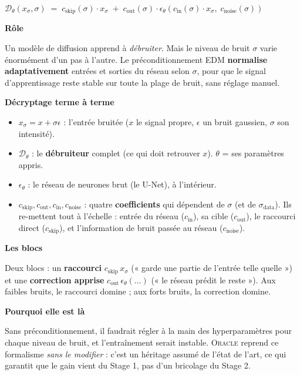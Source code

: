 \documentclass[11pt,a4paper]{article}
\newcommand{\Oracle}{\textsc{Oracle}}
\newcommand{\bloc}[1]{\par\medskip\noindent\textcolor{accent}{\textbf{#1}}\par\nopagebreak\smallskip}
\begin{document}
\begin{formulebox}
\centering $\mathcal{D}_\theta(x_\sigma, \sigma) \;=\; c_{\mathrm{skip}}(\sigma) \cdot x_\sigma \;+\; c_{\mathrm{out}}(\sigma) \cdot \epsilon_\theta\!\left( c_{\mathrm{in}}(\sigma) \cdot x_\sigma,\; c_{\mathrm{noise}}(\sigma) \right)$
\end{formulebox}

\bloc{Rôle}
Un modèle de diffusion apprend à \emph{débruiter}. Mais le niveau de bruit $\sigma$ varie énormément d'un pas à l'autre. Le préconditionnement EDM \textbf{normalise adaptativement} entrées et sorties du réseau selon $\sigma$, pour que le signal d'apprentissage reste stable sur toute la plage de bruit, sans réglage manuel.

\bloc{Décryptage terme à terme}
\begin{itemize}[nosep]
  \item $x_\sigma = x + \sigma\epsilon$ : l'entrée bruitée ($x$ le signal propre, $\epsilon$ un bruit gaussien, $\sigma$ son intensité).
  \item $\mathcal{D}_\theta$ : le \textbf{débruiteur} complet (ce qui doit retrouver $x$). $\theta$ = ses paramètres appris.
  \item $\epsilon_\theta$ : le réseau de neurones brut (le U-Net), à l'intérieur.
  \item $c_{\mathrm{skip}}, c_{\mathrm{out}}, c_{\mathrm{in}}, c_{\mathrm{noise}}$ : quatre \textbf{coefficients} qui dépendent de $\sigma$ (et de $\sigma_{\mathrm{data}}$). Ils re-mettent tout à l'échelle : entrée du réseau ($c_{\mathrm{in}}$), sa cible ($c_{\mathrm{out}}$), le raccourci direct ($c_{\mathrm{skip}}$), et l'information de bruit passée au réseau ($c_{\mathrm{noise}}$).
\end{itemize}

\bloc{Les blocs}
Deux blocs : un \textbf{raccourci} $c_{\mathrm{skip}}\,x_\sigma$ (« garde une partie de l'entrée telle quelle ») et une \textbf{correction apprise} $c_{\mathrm{out}}\,\epsilon_\theta(\dots)$ (« le réseau prédit le reste »). Aux faibles bruits, le raccourci domine ; aux forts bruits, la correction domine.

\bloc{Pourquoi elle est là}
Sans préconditionnement, il faudrait régler à la main des hyperparamètres pour chaque niveau de bruit, et l'entraînement serait instable. \Oracle{} reprend ce formalisme \emph{sans le modifier} : c'est un héritage assumé de l'état de l'art, ce qui garantit que le gain vient du Stage 1, pas d'un bricolage du Stage 2.
\end{document}

